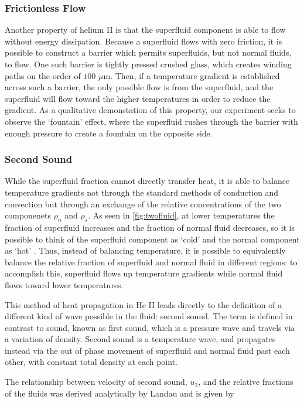 \subsubsection{Frictionless Flow}\label{frictionlessflow}
Another property of helium II is that the superfluid component is able
to flow without energy dissipation. Because a superfluid flows with zero
friction, it is possible to construct a barrier which permits
superfluids, but not normal fluids, to flow. One such barrier is tightly pressed
crushed glass, which creates winding paths on the order of $100$
$\mu$m. Then, if a temperature gradient is established across such a
barrier, the only possible flow is from the superfluid, and the superfluid
will flow toward the higher temperatures in order to reduce the
gradient. As a qualitative demonstation of this property, our
experiment seeks to observe the `fountain' effect, where the
superfluid rushes through the barrier with enough pressure to create a
fountain on the opposite side.

\subsubsection{Second Sound}\label{secondsound}
While the superfluid fraction cannot directly transfer heat, it
is able to balance temperature gradients not through the standard
methods of conduction and convection but through an exchange of the
relative concentrations of the two componenets $\rho_n$ and
$\rho_s$. As seen in \ref{fig:twofluid}, at lower temperatures the
fraction of superfluid increases and the fraction of normal fluid
decreases, so it is possible to think of the superfluid component as
`cold' and the normal component as `hot' \cite{atkins}. Thus, instead
of balancing temperature, it is possible to equivalently balance the
relative fraction of superfluid and normal fluid in different
regions: to accomplish this, superfluid flows up temperature gradients while normal fluid
flows toward lower temperatures.

This method of heat propagation in He II leads directly to the
definition of a different kind of wave possible in the fluid: second
sound. The term is defined in contrast to sound, known as first sound,
which is a pressure wave and travels via a variation of
density. Second sound is a temperature wave, and propagates instead
via the out of phase movement of superfluid and normal fluid past each
other, with constant total density at each point.

The relationship between velocity of second sound, $u_2$, and the
relative fractions of the fluids was derived analytically by Landau
and is given by

